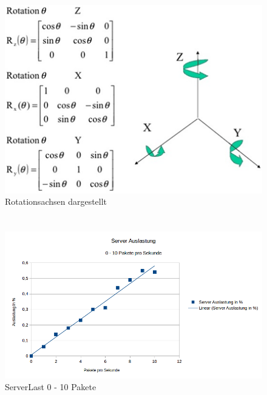 \documentclass[a4paper]{spie}  %
\begin{document}
\begin{appendices}
\section{}
\begin{figure}[H]
	\centering
	\includegraphics[width=1\textwidth]{images/rotation}
	\caption{Rotationsachsen dargestellt}
	\label{rotation}
\end{figure}

\section{}
\begin{figure}[H]
	\centering
	\includegraphics[width=1\textwidth]{images/ServerLast1.png}
	\caption{ServerLast 0 - 10 Pakete}
	\label{serverlast1}
\end{figure}


\end{appendices}
\end{document}
